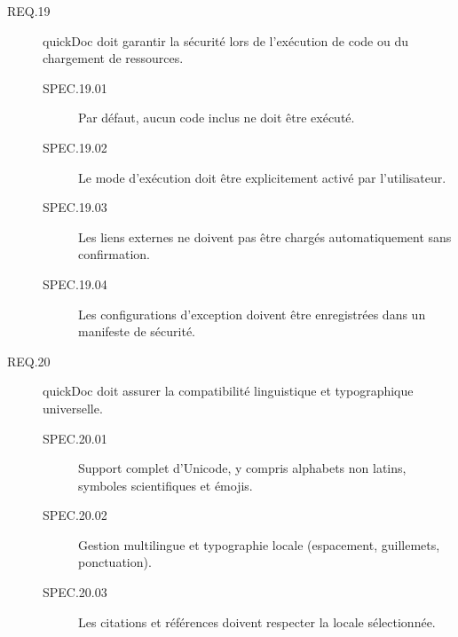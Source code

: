\documentclass[a4paper,12pt]{article}
\begin{document}
\begin{description}
\item[{\label{org5b6b7d0}REQ.19}] quickDoc doit garantir la sécurité lors de l’exécution de code ou du chargement de ressources.
\begin{description}
\item[{\label{org3244b30}SPEC.19.01}] Par défaut, aucun code inclus ne doit être exécuté.
\item[{\label{orgef2e93f}SPEC.19.02}] Le mode d’exécution doit être explicitement activé par l’utilisateur.
\item[{\label{org4686ac4}SPEC.19.03}] Les liens externes ne doivent pas être chargés automatiquement sans confirmation.
\item[{\label{orgfa258a0}SPEC.19.04}] Les configurations d’exception doivent être enregistrées dans un manifeste de sécurité.
\end{description}

\item[{\label{org1d549ca}REQ.20}] quickDoc doit assurer la compatibilité linguistique et typographique universelle.
\begin{description}
\item[{\label{org74a5138}SPEC.20.01}] Support complet d’Unicode, y compris alphabets non latins, symboles scientifiques et émojis.
\item[{\label{orgaff5437}SPEC.20.02}] Gestion multilingue et typographie locale (espacement, guillemets, ponctuation).
\item[{\label{org011b373}SPEC.20.03}] Les citations et références doivent respecter la locale sélectionnée.
\end{description}
\end{description}
\end{document}
